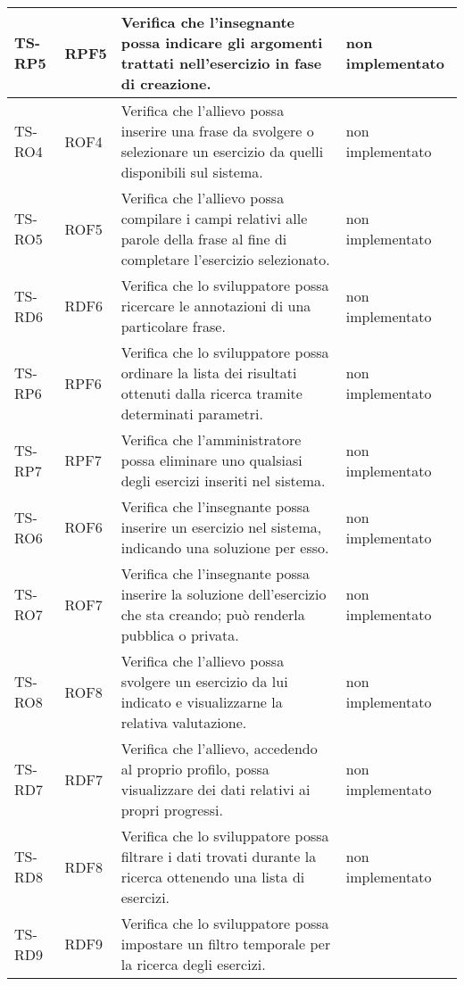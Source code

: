 {\begin{longtable}{|>{\centering\arraybackslash}m{1.6cm}|>{\centering\arraybackslash}m{1.7cm}|m{6.41cm}|>{\centering\arraybackslash}m{3.1cm}|}
		\rowcolor{LightGray}
		TS-RP5		
		& RPF5 
		& Verifica che l'insegnante possa indicare gli argomenti trattati nell'esercizio in fase di creazione.
		& non implementato\\ \hline
		\rowcolor{white}
		TS-RO4		
		& ROF4 
		& Verifica che l'allievo possa inserire una frase da svolgere o selezionare un esercizio da quelli disponibili sul sistema.
		& non implementato\\ \hline
		\rowcolor{LightGray}
		TS-RO5		
		& ROF5 
		& Verifica che l'allievo possa compilare i campi relativi alle parole della frase al fine di completare l'esercizio selezionato.
		& non implementato\\ \hline
		\rowcolor{white}
		TS-RD6		
		& RDF6 
		& Verifica che lo sviluppatore possa ricercare le annotazioni di una particolare frase.
		& non implementato\\ \hline
		\rowcolor{LightGray}
		TS-RP6		
		& RPF6 
		& Verifica che lo sviluppatore possa ordinare la lista dei risultati ottenuti dalla ricerca tramite determinati parametri. 
		& non implementato\\ \hline
		\rowcolor{white}
		TS-RP7		
		& RPF7 
		& Verifica che l'amministratore possa eliminare uno qualsiasi degli esercizi inseriti nel sistema.
		& non implementato\\ \hline
		\rowcolor{LightGray}
		TS-RO6		
		& ROF6 
		& Verifica che l'insegnante possa inserire un esercizio nel sistema, indicando una soluzione per esso. 
		& non implementato\\ \hline
		\rowcolor{white}
		TS-RO7		
		& ROF7 
		& Verifica che l'insegnante possa inserire la soluzione dell'esercizio che sta creando; può renderla pubblica o privata. 
		& non implementato\\ \hline
		\rowcolor{LightGray}
		TS-RO8		
		& ROF8 
		& Verifica che l'allievo possa svolgere un esercizio da lui indicato e visualizzarne la relativa valutazione. 
		& non implementato\\ \hline
		\rowcolor{white}
		TS-RD7		
		& RDF7 
		& Verifica che l'allievo, accedendo al proprio profilo, possa visualizzare dei dati relativi ai propri progressi. 
		& non implementato\\ \hline
		\rowcolor{LightGray}
		TS-RD8		
		& RDF8 
		& Verifica che lo sviluppatore possa filtrare i dati trovati durante la ricerca ottenendo una lista di esercizi. 
		& non implementato\\ \hline
		\rowcolor{white}
		TS-RD9
		& RDF9 
		& Verifica che lo sviluppatore possa impostare un filtro temporale per la ricerca degli esercizi.

\end{longtable}}
